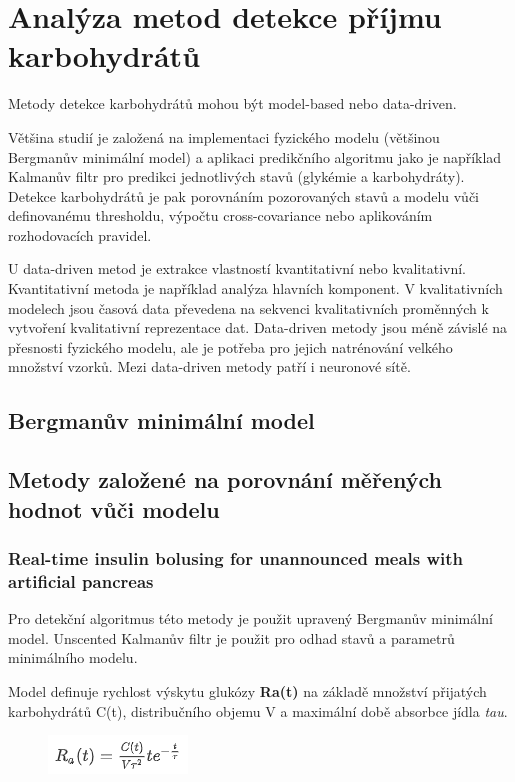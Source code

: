 \chapter{Analýza metod detekce příjmu karbohydrátů}

Metody detekce karbohydrátů mohou být model-based nebo data-driven.

Většina studií je založená na implementaci fyzického modelu (většinou Bergmanův minimální model) a aplikaci predikčního algoritmu jako je například Kalmanův filtr pro predikci jednotlivých stavů (glykémie a karbohydráty). Detekce karbohydrátů je pak porovnáním pozorovaných stavů a modelu vůči definovanému thresholdu, výpočtu cross-covariance nebo aplikováním rozhodovacích pravidel.

U data-driven metod je extrakce vlastností kvantitativní nebo kvalitativní. Kvantitativní metoda je například analýza hlavních komponent. V kvalitativních modelech jsou časová data převedena na sekvenci kvalitativních proměnných k vytvoření kvalitativní reprezentace dat. Data-driven metody jsou méně závislé na přesnosti fyzického modelu, ale je potřeba pro jejich natrénování velkého množství vzorků. Mezi data-driven metody patří i neuronové sítě.

\section{Bergmanův minimální model}

\section{Metody založené na porovnání měřených hodnot vůči modelu}
\subsection{Real-time insulin bolusing for unannounced meals with artificial pancreas \citep{Analyza.Turksoy}}
\label{ch:turksoy}

Pro detekční algoritmus této metody je použit upravený Bergmanův minimální model. Unscented Kalmanův filtr je použit pro odhad stavů a parametrů minimálního modelu.

Model definuje rychlost výskytu glukózy \textbf{Ra(t)} na základě množství přijatých karbohydrátů C(t), distribučního objemu V a maximální době absorbce jídla \textit{tau}.

\begin{figure}[H]{
\label{fig:turksoy1}
\includegraphics{img/analyza/turksoy1.png}}
\end{figure}

